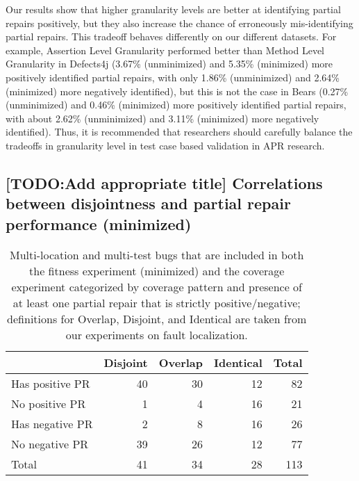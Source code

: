 \documentclass[sigconf, timestamp-false, anonymous=true]{acmart}
\begin{document}
Our results show that higher granularity levels are better at identifying partial repairs positively, 
but they also increase the chance of erroneously mis-identifying partial repairs. 
This tradeoff behaves differently on our different datasets. For example,
Assertion Level Granularity performed better than Method Level Granularity
in Defects4j (3.67\% (unminimized) and 5.35\% (minimized) more positively identified partial repairs, with only 1.86\% (unminimized) and 2.64\% (minimized) more negatively identified), but this is not the case in Bears (0.27\% 
(unminimized) and 0.46\% (minimized)
more positively identified partial repairs, with about 2.62\% (unminimized) and 3.11\% (minimized)
 more negatively identified).
Thus, it is recommended that researchers should 
carefully balance the tradeoffs in granularity level in test case based validation
in APR research.

\subsection{[TODO:Add appropriate title] Correlations between disjointness and partial repair performance (minimized)}

\begin{table}
        {\begin{center}
                        \begin{tabular} {lrrrr}
                                \toprule
                                & Disjoint & Overlap & Identical & Total \\
                                \midrule
                                Has positive PR & 40 & 30 & 12 & 82 \\
                                No positive PR & 1 & 4 & 16 &  21 \\
                \midrule
                                Has negative PR & 2 & 8 & 16 & 26 \\
                                No negative PR & 39 & 26 & 12 & 77 \\
                \midrule
                                Total & 41 & 34 & 28 & 113 \\
                \bottomrule
                        \end{tabular}
                \end{center}
        }
        \caption{Multi-location and multi-test bugs that are included in both the fitness experiment (minimized) and the coverage experiment categorized by coverage pattern and presence of at least one partial repair that is strictly positive/negative; definitions for Overlap, Disjoint, and Identical are taken from our experiments on fault localization.}
        \label{tab:cov_fitness}
\end{table}
\end{document}
